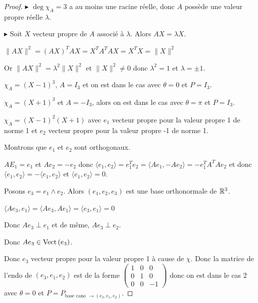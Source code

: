 \begin{proof}
    $\blacktriangleright$ $\deg \chi_A = 3$ a au moins une racine réelle, donc $A$ possède 
    une valeur propre réelle $\lambda$. 

    \avspace $\blacktriangleright$ Soit $X$ vecteur propre de $A$ associé à $\lambda$. 
    Alors $AX = \lambda X$. 

    $\| AX \|^2 = (AX)^T AX = X^T A^T A X = X^T X = \| X \|^2$ 

    Or $\| AX \|^2 = \lambda^2 \| X \|^2$ et $\| X \|^2 \neq 0$ donc $\lambda^2 = 1$ et $\lambda = \pm 1$.


    \svspace $\chi_A = (X - 1)^3$, $A = I_3$ et on est dans le cas avec $\theta = 0$ et $P = I_3$.


    \svspace $\chi_A = (X + 1)^3$ et $A = - I_3$, alors on est dans le cas avec $\theta = \pi$ et $P = I_3$.


    \svspace $\chi_A = (X - 1)^2 (X + 1)$ avec $e_1$ vecteur propre pour la valeur propre 1 de norme 1
    et $e_2$ vecteur propre pour la valeur propre -1 de norme 1.

    Montrons que $e_1$ et $e_2$ sont orthogonaux.

    $A E_1 = e_1$ et $A e_2 = - e_2$ donc $\langle e_1, e_2 \rangle = e_1^T e_2 = \langle A e_1, -A e_2 \rangle = - e_1^T A^T A e_2$
    et donc $\langle e_1, e_2 \rangle = - \langle e_1, e_2 \rangle$ et $\langle e_1, e_2 \rangle = 0$.

    Posons $e_3 = e_1 \wedge e_2$. Alors $(e_1, e_2, e_3)$ est une base orthonormale de $\mathbb{R}^3$. 

    $\langle A e_3, e_1 \rangle = \langle A e_3, A e_1 \rangle = \langle e_3, e_1 \rangle = 0$

    Donc $A e_3 \perp e_1$ et de même, $A e_3 \perp e_2$.

    Donc $A e_3 \in \operatorname{Vect} \,(e_3)$. 

    Donc $e_3$ vecteur propre pour la valeur propre 1 à cause de $\chi$. Donc la matrice de l'endo 
    de $(e_3, e_1, e_2)$ est de la forme $\begin{pmatrix}
        1 & 0 & 0\\
        0 & 1 & 0 \\
        0 & 0 & -1
        \end{pmatrix}$ donc on est dans le cas 2 avec $\theta = 0$ et 
        $P = P_{\text{base cano } \to (e_3, e_1, e_2)}$.


\end{proof}
